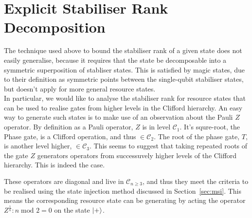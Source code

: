 \documentclass{standalone}
\begin{document}
\section{Explicit Stabiliser Rank Decomposition}\label{sec:decompositions}
The technique used above to bound the stabiliser rank of a given state does not easily generalise, because it requires that the state be decomposable into a symmetric superposition of stabliser states. This is satisfied by magic states, due to their definition as symmetric points between the single-qubit stabiliser states, but doesn't apply for more general resource states. \\
In particular, we would like to analyse the stabiliser rank for resource states that can be used to realise gates from higher levels in the Clifford hierarchy. An easy way to generate such states is to make use of an observation about the Pauli $Z$ operator. By definition as a Pauli operator, $Z$ is in level $\mathcal{C}_{1}$. It's squre-root, the Phase gate, is a Clifford operation, and thus $\in\mathcal{C}_{2}$. The root of the phase gate, $T$, is another level higher, $\in\mathcal{C}_{3}$. This seems to suggest that taking repeated roots of the gate $Z$ generators operators from successuvely higher levels of the Clifford hierarchy. This is indeed the case.
\par
These operators are diagonal and live in $\mathcal{C}_{n\geq3}$, and thus they meet the criteria to be realised using the state injection method discussed in Section~\ref{sec:msi}. This means the corresponding resource state can be generating by acting the operator $Z^{\frac{1}{n}}:n\;\text{mod } 2=0$ on the state $\ket{+}$. \\
\end{document}

